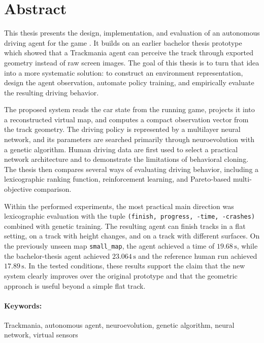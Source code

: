 \newpage
\section*{Abstract}

This thesis presents the design, implementation, and evaluation of an autonomous driving agent for the game \Trackmania{}. It builds on an earlier bachelor thesis prototype which showed that a Trackmania agent can perceive the track through exported geometry instead of raw screen images. The goal of this thesis is to turn that idea into a more systematic solution: to construct an environment representation, design the agent observation, automate policy training, and empirically evaluate the resulting driving behavior.

The proposed system reads the car state from the running game, projects it into a reconstructed virtual map, and computes a compact observation vector from the track geometry. The driving policy is represented by a multilayer neural network, and its parameters are searched primarily through neuroevolution with a genetic algorithm. Human driving data are first used to select a practical network architecture and to demonstrate the limitations of behavioral cloning. The thesis then compares several ways of evaluating driving behavior, including a lexicographic ranking function, reinforcement learning, and Pareto-based multi-objective comparison.

Within the performed experiments, the most practical main direction was lexicographic evaluation with the tuple \texttt{(finish, progress, -time, -crashes)} combined with genetic training. The resulting agent can finish tracks in a flat setting, on a track with height changes, and on a track with different surfaces. On the previously unseen map \texttt{small\_map}, the agent achieved a time of \(19.68\,\mathrm{s}\), while the bachelor-thesis agent achieved \(23.064\,\mathrm{s}\) and the reference human run achieved \(17.89\,\mathrm{s}\). In the tested conditions, these results support the claim that the new system clearly improves over the original prototype and that the geometric approach is useful beyond a simple flat track.

\paragraph*{Keywords:} Trackmania, autonomous agent, neuroevolution, genetic algorithm, neural network, virtual sensors
